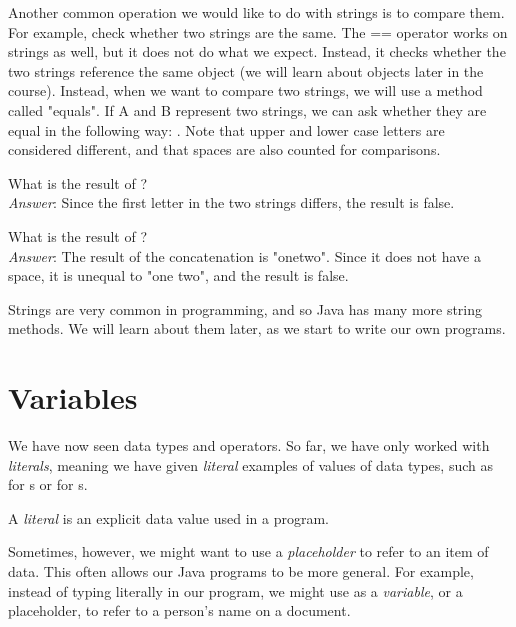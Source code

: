 Another common operation we would like to do with strings is to compare them. For example, check whether two strings are the same. The == operator works on strings as well, but it does not do what we expect. Instead, it checks whether the two strings reference the same object (we will learn about objects later in the course). Instead, when we want to compare two strings, we will use a method called "equals". If A and B represent two strings, we can ask whether they are equal in the following way: . Note that upper and lower case letters are considered different, and that spaces are also counted for comparisons.


\begin{example}
What is the result of ? \\

\noindent \emph{Answer}: Since the first letter in the two strings differs, the result is false.
\end{example}


\begin{example}
What is the result of ? \\

\noindent \emph{Answer}: The result of the concatenation is "onetwo". Since it does not have a space, it is unequal to "one two", and the result is false.
\end{example}

Strings are very common in programming, and so Java has many more string methods. We will learn about them later, as we start to write our own programs.

\section{Variables}
We have now seen data types and operators. So far, we have only worked with \emph{literals}, meaning we have given \emph{literal} examples of values of data types, such as  for s or  for s.

\begin{definition}
A \emph{literal} is an explicit data value used in a program.
\end{definition}

Sometimes, however, we might want to use a \emph{placeholder} to refer to an item of data. This often allows our Java programs to be more general. For example, instead of typing  literally in our program, we might use  as a \emph{variable}, or a placeholder, to refer to a person's name on a document.

